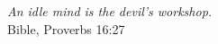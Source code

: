 
{

\vspace*{\fill}

\raggedleft

\textit{An idle mind is the devil's workshop.}\\
Bible, Proverbs 16:27


\vspace*{\fill}

}
